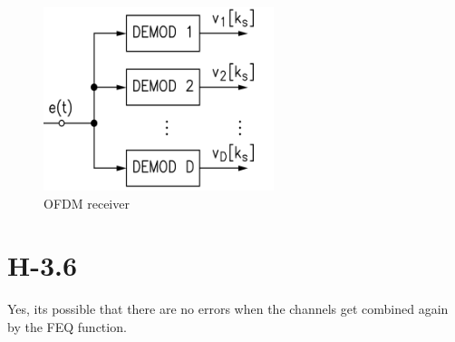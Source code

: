 \documentclass{article}
\begin{document}
\begin{figure}[h]
\centering
\includegraphics[width=0.6\textwidth]{ofdm_receiver.png}
\caption{OFDM receiver}
\label{fig:ofdm_receiver}
\end{figure}


\section{H-3.6}
Yes, its possible that there are no errors when the channels get combined again by the FEQ function.
\end{document}
